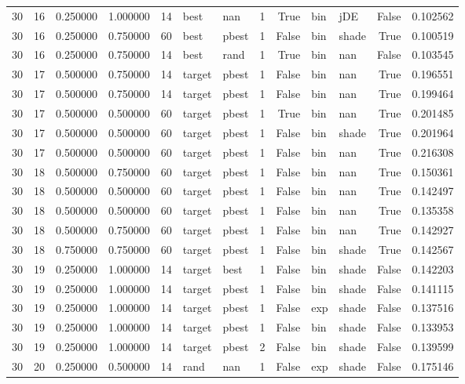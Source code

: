 \begin{tabular}{rrrrrllrrllrr}
30 & 16 & 0.250000 & 1.000000 & 14 & best & nan & 1 & True & bin & jDE & False & 0.102562 \\
30 & 16 & 0.250000 & 0.750000 & 60 & best & pbest & 1 & False & bin & shade & True & 0.100519 \\
30 & 16 & 0.250000 & 0.750000 & 14 & best & rand & 1 & True & bin & nan & False & 0.103545 \\
30 & 17 & 0.500000 & 0.750000 & 14 & target & pbest & 1 & False & bin & nan & True & 0.196551 \\
30 & 17 & 0.500000 & 0.750000 & 14 & target & pbest & 1 & False & bin & nan & True & 0.199464 \\
30 & 17 & 0.500000 & 0.500000 & 60 & target & pbest & 1 & True & bin & nan & True & 0.201485 \\
30 & 17 & 0.500000 & 0.500000 & 60 & target & pbest & 1 & False & bin & shade & True & 0.201964 \\
30 & 17 & 0.500000 & 0.500000 & 60 & target & pbest & 1 & False & bin & nan & True & 0.216308 \\
30 & 18 & 0.500000 & 0.750000 & 60 & target & pbest & 1 & False & bin & nan & True & 0.150361 \\
30 & 18 & 0.500000 & 0.500000 & 60 & target & pbest & 1 & False & bin & nan & True & 0.142497 \\
30 & 18 & 0.500000 & 0.500000 & 60 & target & pbest & 1 & False & bin & nan & True & 0.135358 \\
30 & 18 & 0.500000 & 0.750000 & 60 & target & pbest & 1 & False & bin & nan & True & 0.142927 \\
30 & 18 & 0.750000 & 0.750000 & 60 & target & pbest & 1 & False & bin & shade & True & 0.142567 \\
30 & 19 & 0.250000 & 1.000000 & 14 & target & best & 1 & False & bin & shade & False & 0.142203 \\
30 & 19 & 0.250000 & 1.000000 & 14 & target & pbest & 1 & False & bin & shade & False & 0.141115 \\
30 & 19 & 0.250000 & 1.000000 & 14 & target & pbest & 1 & False & exp & shade & False & 0.137516 \\
30 & 19 & 0.250000 & 1.000000 & 14 & target & pbest & 1 & False & bin & shade & False & 0.133953 \\
30 & 19 & 0.250000 & 1.000000 & 14 & target & pbest & 2 & False & bin & shade & False & 0.139599 \\
30 & 20 & 0.250000 & 0.500000 & 14 & rand & nan & 1 & False & exp & shade & False & 0.175146 \\

\end{tabular}

